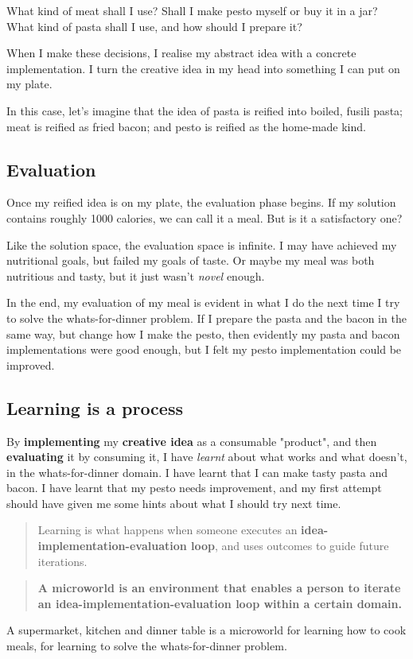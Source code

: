 What kind of meat shall I use? Shall I make pesto myself or buy it in a jar?
What kind of pasta shall I use, and how should I prepare it?

When I make these decisions, I realise my abstract idea
with a concrete implementation. I turn the creative idea in my head
into something I can put on my plate. 

In this case, let's imagine that the idea of pasta is reified into boiled, fusili pasta; meat is reified as fried bacon; and pesto is reified as the home-made kind. 

\subsection{Evaluation}

Once my reified idea is on my plate, the evaluation phase begins. If my
solution contains roughly 1000 calories, we can call it a meal. But is
it a satisfactory one?

Like the solution space, the evaluation space is infinite. I may have
achieved my nutritional goals, but failed my goals of taste. Or maybe my
meal was both nutritious and tasty, but it just wasn't \emph{novel}
enough.

In the end, my evaluation of my meal is evident in what I do the next time I try to solve the whats-for-dinner problem. If I prepare the pasta and the bacon in the same way, but change how I make the pesto, then evidently my pasta and bacon implementations were good enough, but I felt my pesto implementation could be improved. 

\subsection{Learning is a process}

By \textbf{implementing} my \textbf{creative idea} as a consumable "product", and then \textbf{evaluating} it by consuming it, I have \textit{learnt} about what works and what doesn't, in the whats-for-dinner domain. I have learnt that I can make tasty pasta and bacon. I have learnt that my pesto needs improvement, and my first attempt should have given me some hints about what I should try next time. 

\begin{quote}
  Learning is what happens when someone executes an
  \textbf{idea-implementation-evaluation loop}, and uses outcomes to guide future
  iterations.
\end{quote}

\begin{quote}
  \textbf{A microworld is an environment that enables a person to iterate
  an idea-implementation-evaluation loop within a certain domain.}
\end{quote}

A supermarket, kitchen and dinner table is a microworld for learning how to cook meals, for learning to solve the whats-for-dinner problem.
